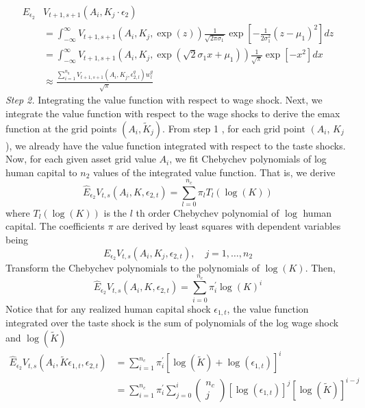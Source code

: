 \documentclass[\econtexRoot/ImaiKeane]{subfiles}
\begin{document}
$$
\begin{aligned}
E_{\epsilon_2} & V_{t+1, s+1}\left(A_i, K_j \cdot \epsilon_2\right) \\
&=\int_{-\infty}^{\infty} V_{t+1, s+1}\left(A_i, K_j, \exp (z)\right) \frac{1}{\sqrt{2 \pi \sigma_1}} \exp \left[-\frac{1}{2 \sigma_1^2}\left(z-\mu_1\right)^2\right] d z \\
&=\int_{-\infty}^{\infty} V_{t+1, s+1}\left(A_i, K_j, \exp \left(\sqrt{2} \sigma_1 x+\mu_1\right)\right) \frac{1}{\sqrt{\pi}} \exp \left[-x^2\right] d x \\
& \approx \frac{\sum_{i=1}^{n_q} V_{t+1, s+1}\left(A_i, K_j, \epsilon_{2, l}^q\right) w_l^q}{\sqrt{\pi}}
\end{aligned}
$$
\textit{Step 2.}      Integrating the value function with respect to wage shock. Next, we integrate the value function with respect to the wage shocks to derive the emax function at the grid points $\left(A_i, \tilde{K}_j\right)$. From step 1 , for each grid point $\left(A_i\right.$, $K_j$ ), we already have the value function integrated with respect to the taste shocks. Now, for each given asset grid value $A_i$, we fit Chebychev polynomials of log human capital to $n_2$ values of the integrated value function. That is, we derive
$$
\hat{E}_{\epsilon_2} V_{t, s}\left(A_i, K, \epsilon_{2, t}\right)=\sum_{l=0}^{n_c} \pi_l T_l(\log (K))
$$
where $T_l(\log (K))$ is the $l$ th order Chebychev polynomial of $\log$ human capital. The coefficients $\pi$ are derived by least squares with dependent variables being
$$
E_{\epsilon_2} V_{t, s}\left(A_i, K_j, \epsilon_{2, t}\right), \quad j=1, \ldots, n_2
$$
Transform the Chebychev polynomials to the polynomials of $\log (K)$. Then,
$$
\hat{E}_{\epsilon_2} V_{t, s}\left(A_i, K, \epsilon_{2, t}\right)=\sum_{i=0}^{n_c} \pi_i^{\prime} \log (K)^i
$$
Notice that for any realized human capital shock $\epsilon_{1, t}$, the value function integrated over the taste shock is the sum of polynomials of the log wage shock and $\log (\tilde{K})$
$$
\begin{aligned}
\hat{E}_{\epsilon_2} V_{t, s}\left(A_i, \tilde{K} \epsilon_{1, t}, \epsilon_{2, t}\right) &=\sum_{i=1}^{n_c} \pi_i^{\prime}\left[\log (\tilde{K})+\log \left(\epsilon_{1, t}\right)\right]^i \\
&=\sum_{i=1}^{n_c} \pi_i^{\prime} \sum_{j=0}^i\left(\begin{array}{c}
n_c \\
j
\end{array}\right)\left[\log \left(\epsilon_{1, t}\right)\right]^j[\log (\tilde{K})]^{i-j}
\end{aligned}
$$
\end{document}
